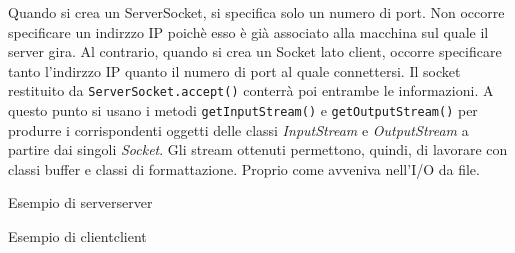 \documentclass[12pt]{report}
\newcommand{\nmu}{}
\begin{document}
Quando si crea un ServerSocket, si specifica solo un numero di port. Non occorre specificare un indirzzo IP poichè esso è già associato alla macchina sul quale il server gira. Al contrario, quando si crea un Socket lato client, occorre specificare tanto l'indirzzo IP quanto il numero di port al quale connettersi. Il socket restituito da \texttt{ServerSocket.accept()} conterrà poi entrambe le informazioni. A questo punto si usano i metodi \texttt{getInputStream()} e \texttt{getOutputStream()} per produrre i corrispondenti oggetti delle classi \textit{InputStream} e \textit{OutputStream} a partire dai singoli \textit{Socket}. Gli stream ottenuti permettono, quindi, di lavorare con classi buffer e classi di formattazione. Proprio come avveniva nell'I/O da file.
\begin{example}{\nmu Esempio di server}{server}

\end{example}
\begin{example}{\nmu Esempio di client}{client}

\end{example}
\end{document}
